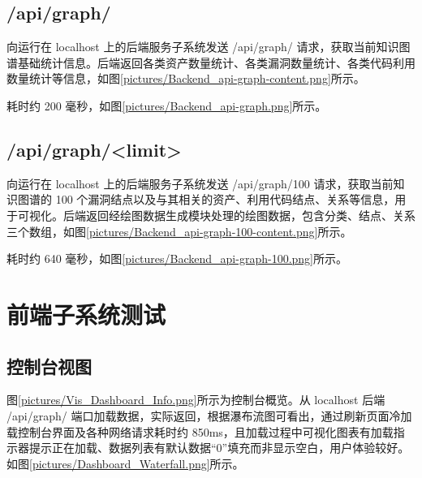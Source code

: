 \documentclass[a4paper,AutoFakeBold,oneside,12pt]{book}
\begin{document}
\subsection{/api/graph/}

向运行在 localhost 上的后端服务子系统发送 /api/graph/ 请求，获取当前知识图谱基础统计信息。后端返回各类资产数量统计、各类漏洞数量统计、各类代码利用数量统计等信息，如图\ref{pictures/Backend_api-graph-content.png}所示。


耗时约 200 毫秒，如图\ref{pictures/Backend_api-graph.png}所示。


\subsection{/api/graph/<limit>}

向运行在 localhost 上的后端服务子系统发送 /api/graph/100 请求，获取当前知识图谱的 100 个漏洞结点以及与其相关的资产、利用代码结点、关系等信息，用于可视化。后端返回经绘图数据生成模块处理的绘图数据，包含分类、结点、关系三个数组，如图\ref{pictures/Backend_api-graph-100-content.png}所示。


耗时约 640 毫秒，如图\ref{pictures/Backend_api-graph-100.png}所示。


\section{前端子系统测试}

\subsection{控制台视图}

图\ref{pictures/Vis_Dashboard_Info.png}所示为控制台概览。从 localhost 后端 /api/graph/ 端口加载数据，实际返回，根据瀑布流图可看出，通过刷新页面冷加载控制台界面及各种网络请求耗时约 850ms，且加载过程中可视化图表有加载指示器提示正在加载、数据列表有默认数据“0”填充而非显示空白，用户体验较好。如图\ref{pictures/Dashboard_Waterfall.png}所示。
\end{document}
